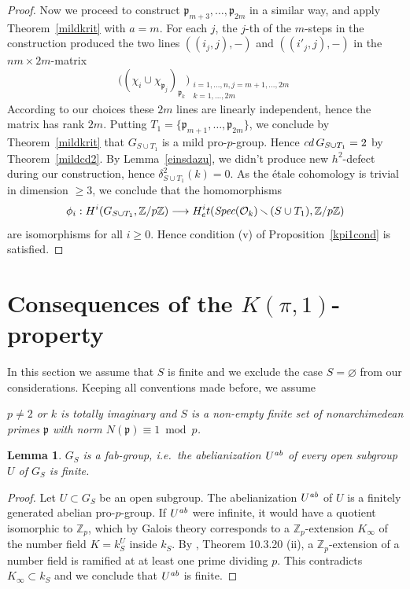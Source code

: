\documentclass[10pt]{article}
\newcommand{\Spec}{\text{\it Spec}}
\newcommand{\Z}{{\mathbb Z}}
\renewcommand{\O}{{\mathcal{O}}}
\newcommand{\ab}{\text{\it ab}}
\newcommand{\p}{{\mathfrak p}}
\newcommand{\sm}{{\,\smallsetminus\,}}
\newcommand{\cd}{\text{\it cd}\:}
\newcommand{\lang}{\longrightarrow}
\theoremstyle{alex}
\newtheorem{lemma}[theorem]{Lemma}
\theoremstyle{alexdef}
\begin{document}
\begin{proof}
\medskip
Now we proceed to construct $\p_{m+3},\ldots, \p_{2m}$ in a similar way, and apply Theorem~\ref{mildkrit} with $a=m$. For each $j$, the $j$-th of the $m$-steps in the construction produced the two lines $((i_j,j), - )$ and $((i'_j,j), - )$ in the $nm{\times}2m$-matrix
\[
\Big( (\chi_i\cup \chi_{\p_{j}})_{\p_k}\Big)_{\substack{
i=1,\ldots,n, j=m+1,\ldots, 2m\\
k=1,\ldots, 2m}}
\]
According to our choices these $2m$ lines are linearly independent, hence the matrix has rank $2m$. Putting $T_1=\{\p_{m+1},\ldots,\p_{2m}\}$, we conclude by Theorem~\ref{mildkrit} that $G_{S\cup T_1}$ is a mild pro-$p$-group. Hence $\cd G_{S\cup T_1}=2$ by Theorem~\ref{mildcd2}. By Lemma~\ref{einsdazu}, we didn't produce new $h^2$-defect during our construction, hence $\delta^2_{S\cup T_1}(k)=0$. As the \'{e}tale cohomology is trivial in dimension $\geq 3$,  we conclude that the homomorphisms
\[
\phi_i: H^i(G_{S\cup T_1},\Z/p\Z) \lang H^i_et(\Spec(\O_k)\sm (S\cup T_1),\Z/p\Z)
\]
are isomorphisms for all $i\geq 0$. Hence condition (v) of Proposition~\ref{kpi1cond} is satisfied.
\end{proof}



\section{\boldmath Consequences of the $K(\pi,1)$-property}

In this section we assume that $S$ is finite and we exclude the case $S=\varnothing$ from our considerations. Keeping all conventions made before, we assume

\medskip
\begin{minipage}{11cm}{\it  $p\neq 2$ or $k$ is totally imaginary and
 $S$ is a non-empty finite set of nonarchimedean primes $\p$ with norm \hbox{$N(\p)\equiv 1 \bmod p$.}}
\end{minipage}




\begin{lemma} \label{fab} $G_S$ is a fab-group, i.e.\
the abelianization $U^\ab$ of every open subgroup $U$ of $G_S$ is finite.
\end{lemma}

\begin{proof} Let $U \subset G_S$ be an open subgroup. The abelianization $U^{\ab}$ of $U$ is a finitely generated abelian pro-$p$-group. If $U^{\ab}$ were infinite, it would have a quotient isomorphic to $\Z_p$, which by Galois theory corresponds to a $\Z_p$-extension $K_\infty$ of the number field $K=k_S^U$ inside $k_S$.
By \cite{NSW}, Theorem 10.3.20 (ii), a $\Z_p$-extension of a number field is ramified at at least one prime dividing $p$. This contradicts $K_\infty\subset k_S$ and we conclude that $U^{\ab}$ is finite.
\end{proof}
\end{document}
